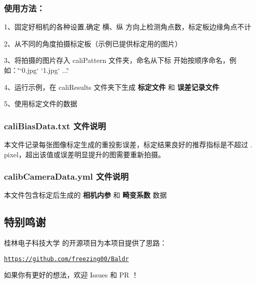 \subsubsection*{使用方法：}

1、固定好相机的各种设置,确定 {\ttfamily 横、纵} 方向上检测角点数，标定板边缘角点不计

2、从不同的角度拍摄标定板（示例已提供标定用的图片）

3、将拍摄的图片存入 {\ttfamily cali\+Pattern} 文件夹，命名从下标 {} 开始按顺序命名，例如：\char`\"{}`0.\+jpg`  `1.\+jpg` ...\char`\"{}

4、运行示例，在 {\ttfamily cali\+Results} 文件夹下生成 {\bfseries 标定文件} 和 {\bfseries 误差记录文件}

5、使用标定文件的数据

\subsubsection*{cali\+Bias\+Data.\+txt 文件说明}

本文件记录每张图像标定生成的重投影误差，标定结果良好的推荐指标是不超过 {. pixel}，超出该值或误差明显提升的图需要重新拍摄。

\subsubsection*{calib\+Camera\+Data.\+yml 文件说明}

本文件包含标定后生成的 {\bfseries 相机内参} 和 {\bfseries 畸变系数} 数据

\subsection*{特别鸣谢}

{\ttfamily 桂林电子科技大学} 的开源项目为本项目提供了思路：

\href{https://github.com/freezing00/Baldr}{\tt https\+://github.\+com/freezing00/\+Baldr}

如果你有更好的想法，欢迎 Issues 和 PR ！ 